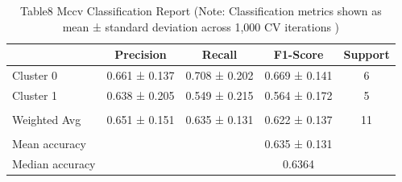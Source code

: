 
\begin{table}[htbp]
    \centering
    \small
    \caption{Table8 Mccv Classification Report (Note: Classification metrics shown as mean ± standard deviation across 1,000 CV iterations
    )}
    \label{tab:table8_mccv_classification_report}
    \begin{tabular}{lcccc}
        \toprule
         & Precision & Recall & F1-Score & Support \\
        \midrule
        Cluster 0 & 0.661 ± 0.137 & 0.708 ± 0.202 & 0.669 ± 0.141 & 6 \\
        Cluster 1 & 0.638 ± 0.205 & 0.549 ± 0.215 & 0.564 ± 0.172 & 5 \\
         &  &  &  &  \\
        Weighted Avg & 0.651 ± 0.151 & 0.635 ± 0.131 & 0.622 ± 0.137 & 11 \\
         &  &  &  &  \\
        Mean accuracy &  &  & 0.635 ± 0.131 &  \\
        Median accuracy &  &  & 0.6364 &  \\
        \bottomrule
    \end{tabular}
\end{table}
